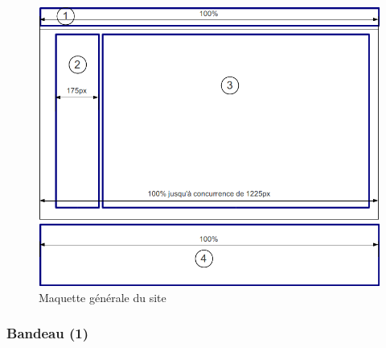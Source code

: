 \documentclass[letter, 11pt]{report}
\begin{document}
\begin{figure}[h!tbp]
	\begin{center}
		\includegraphics[scale=0.59]{maquetteImage.png}
	\end{center}
	\caption{Maquette générale du site}
\end{figure}

\subsubsection{Bandeau (1)}
\end{document}
